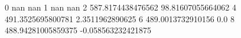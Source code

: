 0 nan nan
1 nan nan
2 587.8174438476562 98.81607055664062
4 491.3525695800781 2.3511962890625
6 489.0013732910156 0.0
8 488.94281005859375 -0.058563232421875

